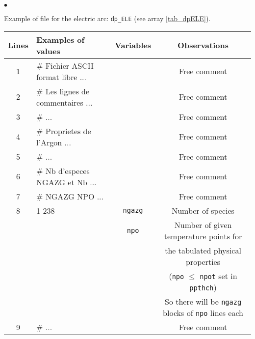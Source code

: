 {{{\begin{list}{$\bullet$}{}
       \item Example of file for the electric arc: \texttt{dp\_ELE} (see
             array \ref{tab_dpELE}).

\begin{table}[htbp]
\begin{center}
\small{
\begin{tabular}{|c|l|c|c|} \hline
 Lines  &        Examples of values        & Variables & Observations                                       \\ \hline
  1     &\# Fichier ASCII format libre ... &           & Free comment                                       \\ \hline
  2     &\# Les lignes de commentaires ... &           & Free comment                                       \\ \hline
  3     &\#                            ... &           & Free comment                                       \\ \hline
  4     &\#   Proprietes de l'Argon    ... &           & Free comment                                       \\ \hline
  5     &\#                            ... &           & Free comment                                       \\ \hline
  6     &\# Nb d'especes NGAZG et Nb   ... &           & Free comment                                       \\ \hline
  7     &\# NGAZG NPO                  ... &           & Free comment                                       \\ \hline
  8     &    1   238         &    \texttt{ngazg\index{ngazg}}   & Number of species                         \\
        &                    &    \texttt{npo\index{npo}}       & Number of given temperature points for    \\
        &                    &                         & the tabulated physical properties                  \\
        &                    &                         & (\texttt{npo} $\leqslant$ \texttt{npot} set in \texttt{ppthch})             \\
        &                    &                         & So there will be \texttt{ngazg} blocks of \texttt{npo} lines each    \\ \hline
  9     &\#                            ... &           & Free comment                                       \\ \hline

\end{tabular}}
\end{center}
\end{table}
\end{list}}}}
